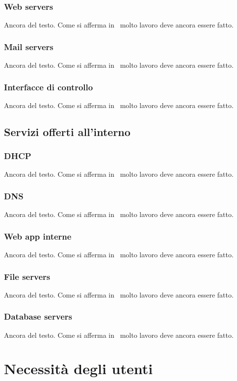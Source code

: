 \subsubsection{Web servers}
Ancora del testo. Come si afferma in~\cite{jones96analysis} molto lavoro deve ancora essere fatto.
\subsubsection{Mail servers}
Ancora del testo. Come si afferma in~\cite{jones96analysis} molto lavoro deve ancora essere fatto.
\subsubsection{Interfacce di controllo}
Ancora del testo. Come si afferma in~\cite{jones96analysis} molto lavoro deve ancora essere fatto.

\subsection{Servizi offerti all'interno}
\subsubsection{DHCP}
Ancora del testo. Come si afferma in~\cite{jones96analysis} molto lavoro deve ancora essere fatto.
\subsubsection{DNS}
Ancora del testo. Come si afferma in~\cite{jones96analysis} molto lavoro deve ancora essere fatto.
\subsubsection{Web app interne}
Ancora del testo. Come si afferma in~\cite{jones96analysis} molto lavoro deve ancora essere fatto.
\subsubsection{File servers}
Ancora del testo. Come si afferma in~\cite{jones96analysis} molto lavoro deve ancora essere fatto.
\subsubsection{Database servers}
Ancora del testo. Come si afferma in~\cite{jones96analysis} molto lavoro deve ancora essere fatto.

\section{Necessità degli utenti}
